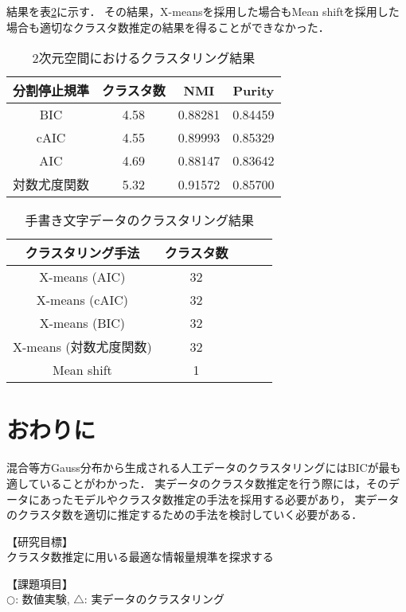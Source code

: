 \documentclass[twocolumn, 10.5pt,a4j]{ltjsarticle}
\def\tableref#1{表\ref{#1}}
\begin{document}
結果を\tableref{table:mnist}に示す．
その結果，X-meansを採用した場合もMean shiftを採用した場合も適切なクラスタ数推定の結果を得ることができなかった．

\begin{table}[htb]
  \centering
  \caption{2次元空間におけるクラスタリング結果}
  \label{table:2dim}
  \begin{tabular}{|c|c|c|c|} \hline
    分割停止規準 & クラスタ数 & NMI & Purity \\\hline
    BIC  & 4.58 & 0.88281 & 0.84459\\
    cAIC & 4.55 & 0.89993 & 0.85329\\
    AIC  & 4.69 & 0.88147 & 0.83642\\
    対数尤度関数 & 5.32 & 0.91572 & 0.85700\\\hline
  \end{tabular}
\end{table}

\begin{table}[htb]
  \centering
  \caption{手書き文字データのクラスタリング結果}
  \label{table:mnist}
  \begin{tabular}{|c|c|c|c|c|} \hline
    クラスタリング手法 & クラスタ数\\\hline
    X-means (AIC) & 32\\
    X-means (cAIC) & 32\\
    X-means (BIC) & 32\\
    X-means (対数尤度関数)& 32\\
    Mean shift & 1\\\hline
  \end{tabular}
\end{table}

\section{おわりに}
混合等方Gauss分布から生成される人工データのクラスタリングにはBICが最も適していることがわかった．
実データのクラスタ数推定を行う際には，そのデータにあったモデルやクラスタ数推定の手法を採用する必要があり，
実データのクラスタ数を適切に推定するための手法を検討していく必要がある．

\vspace{1em}
\noindent【研究目標】\\
クラスタ数推定に用いる最適な情報量規準を探求する

\vspace{1em}
\noindent【課題項目】\\
$\bigcirc$: 数値実験, $\bigtriangleup$: 実データのクラスタリング\noindent
\end{document}
